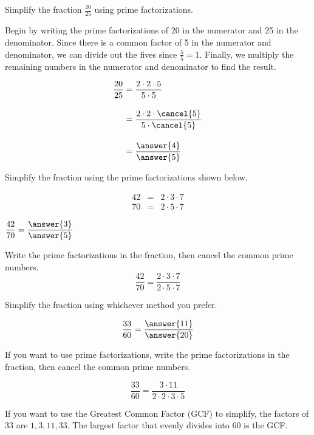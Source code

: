\documentclass{ximera}[font=12pt]  %
\begin{document}
\begin{example}
  
Simplify the fraction $\displaystyle \frac{20}{25}$ using prime factorizations.

\begin{explanation}

Begin by writing the prime factorizations of 20 in the numerator and 25 in the denominator.  Since there is a common 
factor of 5 in the numerator and denominator, we can divide out the fives since $\frac{5}{5}=1.$  Finally, we
multiply the remaining numbers in the numerator and denominator to find the result. 

\begin{align*}
\frac{20}{25} &= \frac{2 \cdot 2 \cdot 5}{5 \cdot 5} \\[1em]
              &= \frac{2 \cdot 2 \cdot \cancel{5}}{5 \cdot \cancel{5}} \\[1em]
              &= \frac{ \answer{4}}{ \answer{5} }
\end{align*}


\end{explanation}
\end{example}

\begin{problem}
Simplify the fraction using the prime factorizations shown below.

\begin{eqnarray*}
    42 &=& 2 \cdot 3 \cdot 7 \\
    70 &=& 2 \cdot 5 \cdot 7
\end{eqnarray*}

$\displaystyle \frac{42}{70} = \frac{\answer{3}}{\answer{5}}$

  \begin{hint}
    Write the prime factorizations in the fraction, then cancel the common prime numbers.
    \[ \frac{42}{70} = \frac{2 \cdot 3 \cdot 7}{2 \cdot 5 \cdot 7} \]
  \end{hint}

\end{problem}


\begin{problem}
Simplify the fraction using whichever method you prefer.

\[ \frac{33}{60} = \frac{\answer{11}}{\answer{20}}\]

\begin{hint}
   If you want to use prime factorizations, write the prime factorizations in the fraction, then cancel the common prime numbers.

    \[ \frac{33}{60} = \frac{3 \cdot 11}{2 \cdot 2 \cdot 3 \cdot 5} \]

  \end{hint}

  \begin{hint}
    If you want to use the Greatest Common Factor (GCF) to simplify, the factors of $33$ are $1, 3, 11, 33.$  The largest factor
    that evenly divides into $60$ is the GCF.  
  \end{hint}

\end{problem}
\end{document}
